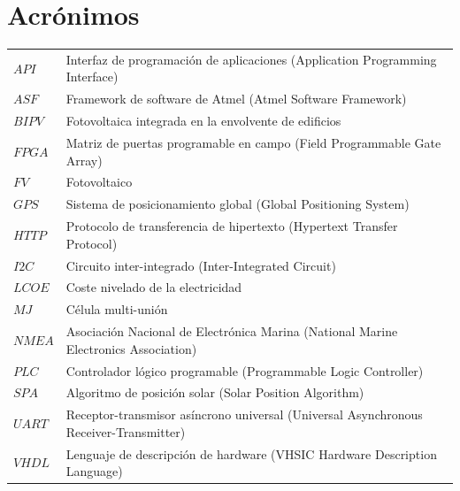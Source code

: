 \chapter{Acrónimos}
\begin{tabular}{ll}
	$API$ & Interfaz de programación de aplicaciones (Application Programming Interface) \\
	$ASF$ & Framework de software de Atmel (Atmel Software Framework) \\
	$BIPV$ & Fotovoltaica integrada en la envolvente de edificios \\
	$FPGA$ & Matriz de puertas programable en campo (Field Programmable Gate Array) \\
	$FV$ & Fotovoltaico \\
	$GPS$ & Sistema de posicionamiento global (Global Positioning System) \\
	$HTTP$ & Protocolo de transferencia de hipertexto (Hypertext Transfer Protocol) \\
	$I2C$ & Circuito inter-integrado (Inter-Integrated Circuit) \\
	$LCOE$ & Coste nivelado de la electricidad \\
	$MJ$ & Célula multi-unión \\
	$NMEA$ & Asociación Nacional de Electrónica Marina (National Marine Electronics Association) \\
	$PLC$ & Controlador lógico programable (Programmable Logic Controller) \\
	$SPA$ & Algoritmo de posición solar (Solar Position Algorithm) \\
	$UART$ & Receptor-transmisor asíncrono universal (Universal Asynchronous Receiver-Transmitter) \\
	$VHDL$ & Lenguaje de descripción de hardware (VHSIC Hardware Description Language) \\
\end{tabular}

